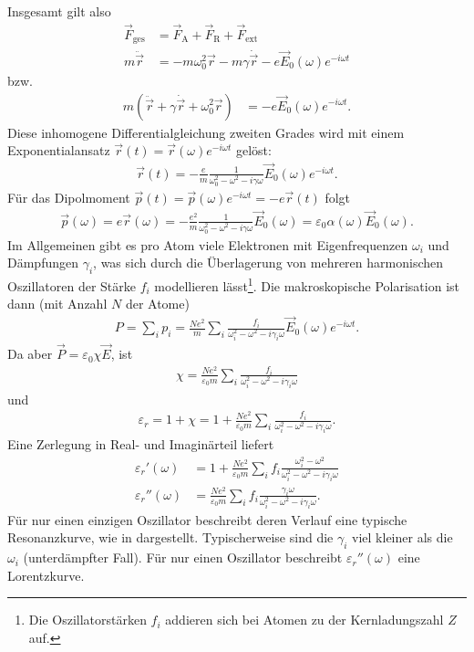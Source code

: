Insgesamt gilt also
\begin{align*}
    \vec F_\mathrm{ges} & =\vec F_\mathrm{A} + \vec F_\mathrm{R} + \vec F_\mathrm{ext}               \\
    m\ddot{\vec r}      & = -m\omega_0^2 \vec r-m\gamma\dot{\vec r} -e\vec E_0(\omega)e^{-i\omega t}
\end{align*}
bzw.
\begin{align*}
    m\left(\ddot{\vec r}+\gamma\dot{\vec r} +\omega_0^2 \vec r\right) & = -e\vec E_0(\omega)e^{-i\omega t}.
\end{align*}
Diese inhomogene Differentialgleichung zweiten Grades wird mit einem Exponentialansatz $\vec r(t)=\vec r(\omega)e^{-i\omega t}$ gelöst:
\begin{align*}
    \vec r(t) = -\frac{e}{m} \frac{1}{\omega_0^2-\omega^2-i\gamma\omega} \vec E_0(\omega)e^{-i\omega t}.
\end{align*}
Für das Dipolmoment $\vec p(t)=\vec p(\omega)e^{-i\omega t} = -e\vec r(t)$ folgt
\begin{align*}
    \vec p(\omega) = e\vec r(\omega)= -\frac{e^2}{m} \frac{1}{\omega_0^2-\omega^2-i\gamma\omega} \vec E_0(\omega) = \varepsilon_0 \alpha(\omega)\vec E_0(\omega).
\end{align*}
Im Allgemeinen gibt es pro Atom viele Elektronen mit Eigenfrequenzen $\omega_i$ und Dämpfungen $\gamma_i$, was sich durch die Überlagerung von mehreren harmonischen Oszillatoren der Stärke $f_i$ modellieren lässt\footnote{Die Oszillatorstärken $f_i$ addieren sich bei Atomen zu der Kernladungszahl $Z$ auf.}.
Die makroskopische Polarisation ist dann (mit Anzahl $N$ der Atome)
\begin{align*}
    P = \sum_i p_i = \frac{Ne^2}{m}\sum_i  \frac{f_i}{\omega_i^2-\omega^2-i\gamma_i\omega} \vec E_0(\omega)e^{-i\omega t}.
\end{align*}
Da aber $\vec P=\varepsilon_0 \chi \vec E$, ist
\begin{align*}
    \chi = \frac{Ne^2}{\varepsilon_0 m} \sum_i \frac{f_i}{\omega_i^2-\omega^2-i\gamma_i\omega}
\end{align*}
und
\begin{align*}
    \varepsilon_r = 1+\chi = 1+ \frac{Ne^2}{\varepsilon_0 m} \sum_i \frac{f_i}{\omega_i^2-\omega^2-i\gamma_i\omega}.
\end{align*}
Eine Zerlegung in Real- und Imaginärteil liefert
\begin{align}
    \label{eq:realteil_epsilon_r}
    \varepsilon_r'(\omega)  & = 1 + \frac{Ne^2}{\varepsilon_0 m} \sum_i f_i\frac{\omega_i^2-\omega^2}{\omega_i^2-\omega^2-i\gamma_i\omega} \\
    \label{eq:imagnaerteil_epsilon_r}
    \varepsilon_r''(\omega) & = \frac{Ne^2}{\varepsilon_0 m} \sum_i f_i\frac{ \gamma_i\omega}{\omega_i^2-\omega^2-i\gamma_i\omega} .
\end{align}
Für nur einen einzigen Oszillator beschreibt deren Verlauf eine typische Resonanzkurve, wie in  dargestellt.
Typischerweise sind die $\gamma_i$ viel kleiner als die $\omega_i$ (unterdämpfter Fall).
Für nur einen Oszillator beschreibt $\varepsilon_r''(\omega)$ eine Lorentzkurve.


